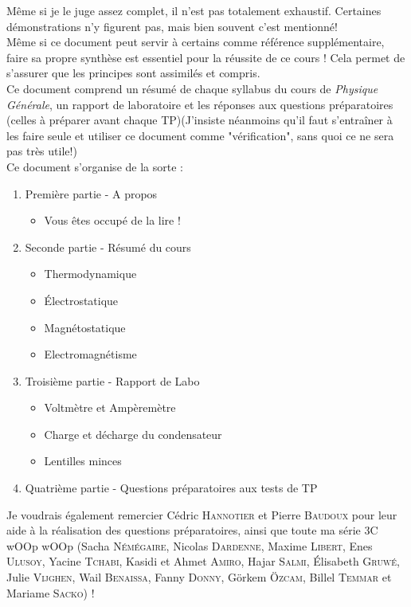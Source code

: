 \documentclass	[11pt, a4paper, openany]{book}
\begin{document}
Même si je le juge assez complet, il n'est pas totalement exhaustif. Certaines démonstrations n'y figurent pas, mais bien souvent c'est mentionné! \\
Même si ce document peut servir à certains comme référence supplémentaire, faire sa propre synthèse est essentiel pour la réussite de ce cours ! Cela permet de s'assurer que les principes sont assimilés et compris.\\

Ce document comprend un résumé de chaque syllabus du cours de \textit{Physique Générale}, un rapport de laboratoire et les réponses aux questions préparatoires (celles à préparer avant chaque TP)(J'insiste néanmoins qu'il faut s'entraîner à les faire seule et utiliser ce document comme "vérification", sans quoi ce ne sera pas très utile!)\\ 
Ce document s'organise de la sorte :
\begin{enumerate}
\item Première partie - A propos
\begin{itemize}
\item Vous êtes occupé de la lire !
\end{itemize}
\item Seconde partie - Résumé du cours
\begin{itemize}
\item Thermodynamique
\item Électrostatique
\item Magnétostatique
\item Electromagnétisme
\end{itemize}
\item Troisième partie - Rapport de Labo
\begin{itemize}
\item Voltmètre et Ampèremètre
\item Charge et décharge du condensateur
\item Lentilles minces
\end{itemize}
\item Quatrième partie - Questions préparatoires aux tests de TP
\end{enumerate}

Je voudrais également remercier Cédric \textsc{Hannotier} et Pierre \textsc{Baudoux} pour leur aide à la réalisation des questions préparatoires, ainsi que toute ma série 3C wOOp wOOp (Sacha \textsc{Némégaire}, Nicolas \textsc{Dardenne}, Maxime \textsc{Libert}, Enes \textsc{Ulusoy}, Yacine \textsc{Tchabi}, Kasidi et Ahmet \textsc{Amiro}, Hajar \textsc{Salmi}, Élisabeth \textsc{Gruwé}, Julie \textsc{Vijghen}, Wail \textsc{Benaissa}, Fanny \textsc{Donny}, Görkem \textsc{Özcam}, Billel \textsc{Temmar} et Mariame \textsc{Sacko}) ! \\
\end{document}
